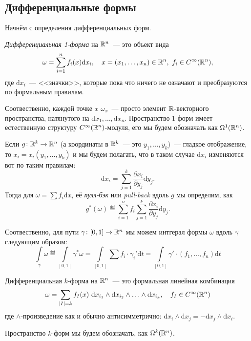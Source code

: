	
	\subsection{Дифференциальные формы}	
	
	Начнём с определения дифференциальных форм. 

	\begin{definition} 
		\emph{Дифференциальная 1-форма} на $\mathbb{R}^n$~--- это объект вида 
		\[
			\omega = \sum_{i = 1}^{n} f_i(x) \mathrm{d}x_i, \quad x = (x_1, \ldots, x_n) \in \mathbb{R}^n, \ f_i \in C^{\infty}(\mathbb{R}^n),
		\]
		где $\mathrm{d}x_i$~--- <<значки>>, которые пока что ничего не означают и преобразуются по формальным правилам. 
	\end{definition}

	Соотвественно, каждой точке $x$ $\omega_{x}$~--- просто элемент $\mathbb{R}$-векторного пространства, натянутого на $\mathrm{d}x_1, \ldots, \mathrm{d}x_n$. Пространство 1-форм имеет естественную структуру $C^{\infty}(\mathbb{R}^n)$-модуля, его мы будем обозначать как $\Omega^{1}(\mathbb{R}^n)$. 

	Если $g\colon \mathbb{R}^k \to \mathbb{R}^n$ (а координаты в $\mathbb{R}^k$~--- это $y_1, \ldots, y_k$)~--- гладкое отображение, то $x_i = x_i(y_1, \ldots, y_k)$ и мы будем полагать, что в таком случае $\mathrm{d}x_i$ изменяются вот по таким правилам: 
	\[
		\mathrm{d}x_i = \sum_{j = 1}^{k} \frac{\partial x_i}{\partial y_j} \mathrm{d}y_{j}.
	\]
	Тогда для $\omega = \sum f_i \mathrm{d}x_i$ её \emph{пулл-бэк} или \emph{pull-back} вдоль $g$ мы определим, как 
	\[
		g^{*}(\omega) \eqdef \sum_{i = 1}^{n} f_{i} \sum_{j = 1}^{k} \frac{\partial x_i}{\partial y_{j}} \mathrm{d}y_{j}.
	\]

	Соотвественно, для пути $\gamma\colon [0,1] \to \mathbb{R}^n$ мы можем интгерал формы $\omega$ вдоль $\gamma$ следующим образом: 
	\[
		\int\limits_{\gamma} \omega \eqdef \int\limits_{[0, 1]} \gamma^{*}\omega = \int\limits_{[0, 1]} \sum f_{i} \cdot \gamma_{i}' \mathrm{d} t= \int\limits_{[0, 1]} \gamma' \cdot (f_1, \ldots, f_n) \mathrm{d}t
	\]

	\begin{definition} 
		Дифференциальная $k$-форма на $\mathbb{R}^n$~--- это формальная линейная комбинация 
		\[
			\omega = \sum_{|I| = k} f_{I}(x)\  \mathrm{d}x_{i_{1}} \wedge \mathrm{d} x_{i_{2}} \wedge \ldots \wedge \mathrm{d}x_{i_{k}}, \quad f_{I} \in C^{\infty}(\mathbb{R}^n)
		\]
		где $\wedge$-произведение как и обычно антисимметрично: $\mathrm{d}x_i \wedge \mathrm{d}x_{j} = - \mathrm{d}x_{j} \wedge \mathrm{d}x_{i}$.

		Пространство $k$-форм мы будем обозначать, как $\Omega^k(\mathbb{R}^n)$.
	\end{definition}

